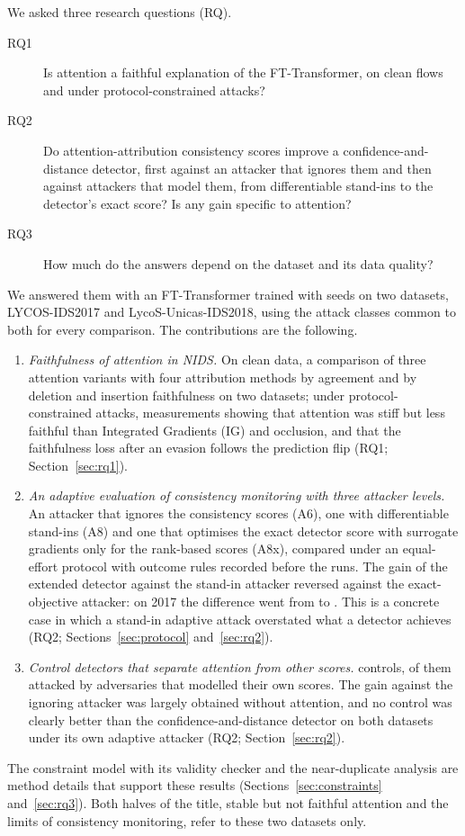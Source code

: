 We asked three research questions (RQ).
\begin{description}
  \item[RQ1] Is attention a faithful explanation of the FT-Transformer, on clean flows and under protocol-constrained
             attacks?
  \item[RQ2] Do attention-attribution consistency scores improve a confidence-and-distance detector, first against an
             attacker that ignores them and then against attackers that model them, from differentiable stand-ins to
             the detector's exact score? Is any gain specific to attention?
  \item[RQ3] How much do the answers depend on the dataset and its data quality?
\end{description}
We answered them with an FT-Transformer trained with \nSeeds{} seeds on two datasets, LYCOS-IDS2017 and
LycoS-Unicas-IDS2018, using the \nCommonClasses{} attack classes common to both for every comparison.
The contributions are the following.
\begin{enumerate}
  \item \emph{Faithfulness of attention in NIDS.} On clean data, a comparison of three attention variants with four
        attribution methods by agreement and by deletion and insertion faithfulness on two datasets; under
        protocol-constrained attacks, measurements showing that attention was stiff but less faithful than Integrated
        Gradients (IG) and occlusion, and that the faithfulness loss after an evasion follows the prediction flip
        (RQ1; Section~\ref{sec:rq1}).
  \item \emph{An adaptive evaluation of consistency monitoring with three attacker levels.} An attacker that ignores
        the consistency scores (A6), one with differentiable stand-ins (A8) and one that optimises the exact detector
        score with surrogate gradients only for the rank-based scores (A8x), compared under an equal-effort protocol
        with outcome rules recorded before the runs.
        The gain of the extended detector against the stand-in attacker reversed against the exact-objective attacker:
        on 2017 the difference went from \axStandinVoneSeventeen{} to \axHeadVoneSeventeen.
        This is a concrete case in which a stand-in adaptive attack overstated what a detector achieves
        (RQ2; Sections~\ref{sec:protocol} and~\ref{sec:rq2}).
  \item \emph{Control detectors that separate attention from other scores.} \nControlsAll{} controls, \nControlsAttacked{} of them
        attacked by adversaries that modelled their own scores.
        The gain against the ignoring attacker was largely obtained without attention, and no control was clearly
        better than the confidence-and-distance detector on both datasets under its own adaptive attacker
        (RQ2; Section~\ref{sec:rq2}).
\end{enumerate}
The constraint model with its validity checker and the near-duplicate analysis are method details that support these
results (Sections~\ref{sec:constraints} and~\ref{sec:rq3}).
Both halves of the title, stable but not faithful attention and the limits of consistency monitoring, refer to these two
datasets only.
